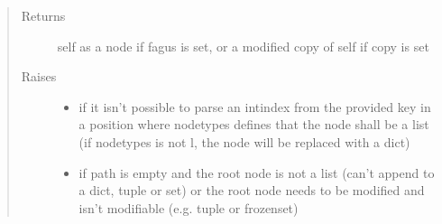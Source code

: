 \documentclass[a4paper,10pt,english]{sphinxmanual}
\begin{document}
\begin{fulllineitems}
\begin{fulllineitems}
\begin{quote}
\begin{description}
\begin{itemize}
\end{itemize}

\item[{Returns}] \leavevmode
\sphinxAtStartPar
self as a node if fagus is set, or a modified copy of self if copy is set

\item[{Raises}] \leavevmode\begin{itemize}
\item {}
\sphinxAtStartPar
{} \textendash{} if it isn’t possible to parse an int\sphinxhyphen{}index from the provided key in a position where node\sphinxhyphen{}types
    defines that the node shall be a list (if node\sphinxhyphen{}types is not l, the node will be replaced with a dict)

\item {}
\sphinxAtStartPar
{} \textendash{} if path is empty and the root node is not a list (can’t append to a dict, tuple or set) or the
    root node needs to be modified and isn’t modifiable (e.g. tuple or frozenset)

\end{itemize}

\end{description}\end{quote}

\end{fulllineitems}



\end{fulllineitems}
\end{document}
